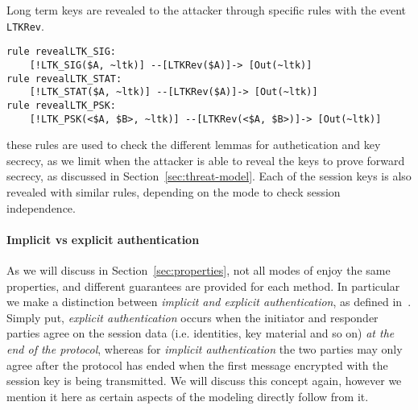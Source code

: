 Long term keys are revealed to the attacker through specific rules
with the event \lstinline{LTKRev}.
\begin{lstlisting}
rule revealLTK_SIG:
    [!LTK_SIG($A, ~ltk)] --[LTKRev($A)]-> [Out(~ltk)]
rule revealLTK_STAT:
    [!LTK_STAT($A, ~ltk)] --[LTKRev($A)]-> [Out(~ltk)]
rule revealLTK_PSK:
    [!LTK_PSK(<$A, $B>, ~ltk)] --[LTKRev(<$A, $B>)]-> [Out(~ltk)]
\end{lstlisting}
these rules are used to check the different lemmas for authetication
and key secrecy, as we limit when the attacker is able to reveal the
keys to prove forward secrecy, as discussed in
Section~\ref{sec:threat-model}.
%
Each of the session keys is also revealed with similar rules,
depending on the mode to check session independence.

\paragraph{Implicit vs explicit authentication}
As we will discuss in Section~\ref{sec:properties}, not all modes of
\mEdhoc{} enjoy the same properties, and different guarantees are
provided for each method.
%
In particular we make a distinction between \emph{implicit and
  explicit authentication}, as defined
in~\cite{DBLP:journals/iacr/GuilhemFW19}.
%
Simply put, \emph{explicit authentication} occurs when the initiator
and responder parties agree on the session data (i.e. identities, key
material and so on) \emph{at the end of the protocol}, whereas for
\emph{implicit authentication} the two parties may only agree after
the protocol has ended when the first message encrypted with the
session key is being transmitted.
%
We will discuss this concept again, however we mention it here as
certain aspects of the modeling directly follow from it.


